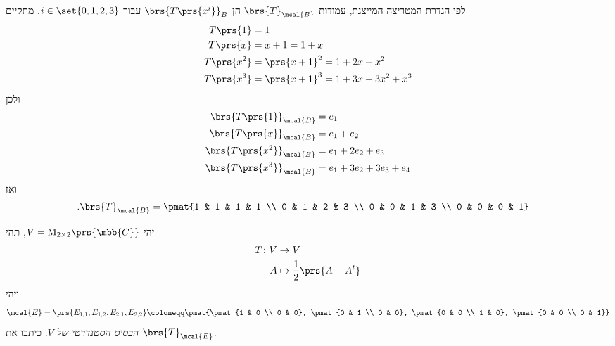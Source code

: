 \documentclass[a4paper,10pt,twoside,openany]{book}
\renewcommand{\Mat}{\mathrm{M}}
\begin{document}
\begin{solution}
לפי הגדרת המטריצה המייצגת,
עמודות
$\brs{T}_\mcal{B}$
הן
$\brs{T\prs{x^i}}_B$
עבור
$i \in \set{0,1,2,3}$.
מתקיים
\begin{align*}
T\prs{1} &= 1 \\
T\prs{x} &= x+1 = 1 + x \\
T\prs{x^2} &= \prs{x+1}^2 = 1 + 2x + x^2 \\
T\prs{x^3} &= \prs{x+1}^3 = 1 + 3x + 3x^2 + x^3
\end{align*}
ולכן
\begin{align*}
\brs{T\prs{1}}_\mcal{B} &= e_1 \\
\brs{T\prs{x}}_\mcal{B} &= e_1 + e_2 \\
\brs{T\prs{x^2}}_\mcal{B} &= e_1 + 2 e_2 + e_3 \\
\brs{T\prs{x^3}}_\mcal{B} &= e_1 + 3 e_2 + 3 e_3 + e_4
\end{align*}
ואז
\begin{align*}
\text{.} \brs{T}_\mcal{B} &= \pmat{1 & 1 & 1 & 1 \\ 0 & 1 & 2 & 3 \\ 0 & 0 & 1 & 3 \\ 0 & 0 & 0 & 1}
\end{align*}
\end{solution}

\begin{exercisechap}
יהי
$V = \Mat_{2 \times 2}\prs{\mbb{C}}$,
תהי
\begin{align*}
T \colon V &\to V \\
A &\mapsto \frac{1}{2} \prs{A - A^t}
\end{align*}
ויהי
\[\mcal{E} = \prs{E_{1,1}, E_{1,2}, E_{2,1}, E_{2,2}} \coloneqq \pmat{\pmat{1 & 0 \\ 0 & 0}, \pmat{0 & 1 \\ 0 & 0}, \pmat{0 & 0 \\ 1 & 0}, \pmat{0 & 0 \\ 0 & 1}}\]
\emph{הבסיס הסטנדרטי של
$V$}.
כיתבו את
$\brs{T}_\mcal{E}$.
\end{exercisechap}
\end{document}
